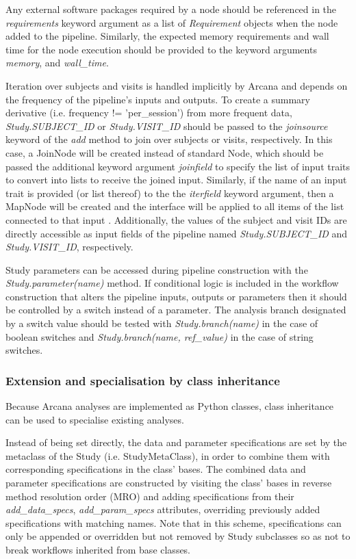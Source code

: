 \documentclass[smallextended]{svjour3}       %
\begin{document}
Any external software packages required by a node should be referenced
in the \emph{requirements} keyword argument as a list of
\emph{Requirement} objects when the node added to the pipeline.
Similarly, the expected memory requirements and
wall time for the node execution should be provided to the keyword arguments
\emph{memory}, and \emph{wall\_time}.

Iteration over subjects and visits is handled implicitly by Arcana and
depends on the frequency of the pipeline's inputs and outputs. To create
a summary derivative (i.e. frequency != 'per\_session') from more frequent
data, \emph{Study.SUBJECT\_ID} or \emph{Study.VISIT\_ID} should be
passed to the \emph{joinsource} keyword of the \emph{add} method to join over subjects or visits, respectively.
In this case, a JoinNode will be created instead of standard Node,
which should be passed the additional keyword argument \emph{joinfield} to
specify the list of input traits to convert into lists to receive the joined input.
Similarly, if the name of an input trait is provided (or list thereof) to the the \emph{iterfield}
keyword argument, then a MapNode will be created and the interface will
be applied to all items of the list connected to that input \citep{gorgolewski_nipype:_2011}.
Additionally, the values of the subject and visit IDs are directly accessible as input fields of the pipeline
named \emph{Study.SUBJECT\_ID} and \emph{Study.VISIT\_ID}, respectively.

Study parameters can be accessed during pipeline construction with the
\emph{Study.parameter(name)} method. If conditional logic is included in
the workflow construction that alters the pipeline inputs, outputs or
parameters then it should be controlled by a switch instead of a
parameter. The analysis branch designated by a switch value should be
tested with \emph{Study.branch(name)} in the case of boolean switches and
\emph{Study.branch(name, ref\_value)} in the case of string switches.

\subsubsection*{Extension and specialisation by class inheritance}
\label{extension-and-specialisation-by-class-inheritance}

Because Arcana analyses are implemented as Python classes, class
inheritance can be used to specialise existing analyses.

Instead of being set directly, the data and parameter specifications are set
by the metaclass of the Study (i.e. StudyMetaClass),
in order to combine them with corresponding specifications in the class' bases. The combined
data and parameter specifications are constructed by visiting the class'
bases in reverse method resolution order (MRO) and adding specifications
from their \emph{add\_data\_specs}, \emph{add\_param\_specs} attributes,
overriding previously added specifications with matching names. Note
that in this scheme, specifications can only be appended or overridden
but not removed by Study subclasses so as not to break workflows
inherited from base classes.
\end{document}
